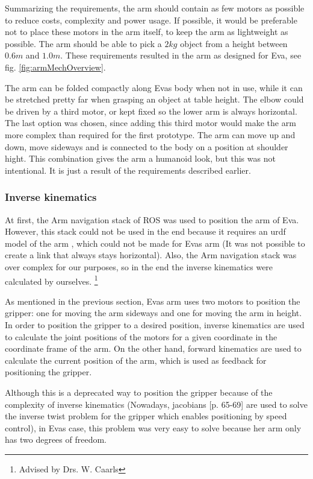 \documentclass[project_eva.tex]{subfiles}
\begin{document}
Summarizing the requirements, the arm should contain as few motors as possible to reduce costs, complexity and power 
usage. If possible, it would be preferable not to place these motors in the arm itself, to keep the arm as lightweight as 
possible. The arm should be able to pick a $2kg$ object from a height between $0.6m$ and $1.0m$. These requirements 
resulted in the arm as designed for Eva, see fig. \ref{fig:armMechOverview}.

The arm can be folded compactly along Eva\textquotesingle s body when not in use, while it can be stretched pretty far 
when grasping an object at table height. The elbow could be driven by a third motor, or kept fixed so the lower arm is 
always horizontal. The last option was chosen, since adding this third motor would make the arm more complex than 
required for the first prototype. The arm can move up and down, move sideways and is connected to the body on a position 
at shoulder hight. This combination gives the arm a humanoid look, but this was not intentional. It is just a result of 
the requirements described earlier.

\subsubsection*{Inverse kinematics}
At first, the Arm navigation stack of ROS was used to position the arm of Eva. However, this stack could not be used in 
the end because it requires an urdf model of the arm \cite{urdf}, which could not be made for Eva\textquotesingle s arm 
(It was not possible to create a link that always stays horizontal). Also, the Arm navigation stack was over complex for 
our purposes, so in the end the inverse kinematics were calculated by ourselves. \footnote{Advised by Drs. W. Caarls} 

As mentioned in the previous section, Eva\textquotesingle s arm uses two motors to position the gripper: one for moving 
the arm sideways and one for moving the arm in height. In order to position the gripper to a desired position, inverse 
kinematics are used to calculate the joint positions of the motors for a given coordinate in the coordinate frame of the 
arm. On the other hand, forward kinematics are used to calculate the current position of the arm, which is used as 
feedback for positioning the gripper. 

Although this is a deprecated way to position the gripper because of the complexity of inverse kinematics  (Nowadays, 
jacobians \cite{jacobian} [p. 65-69] are used to solve the inverse twist 
problem for the gripper which enables positioning by speed control), in Eva\textquotesingle s case, this problem was 
very easy to solve because her arm only has two degrees of freedom. 
\end{document}
